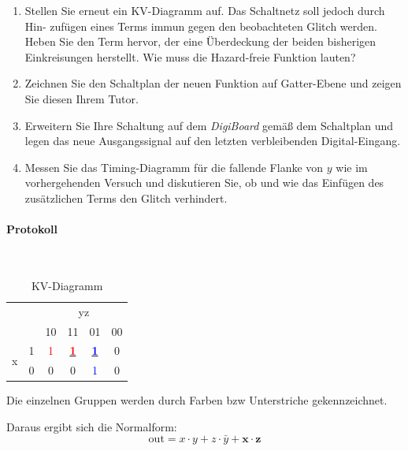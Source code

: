 \documentclass[10pt]{scrreprt}
\begin{document}
    \begin{enumerate}
        \item Stellen Sie erneut ein KV-Diagramm auf. Das Schaltnetz soll jedoch durch Hin-
            zufügen eines Terms immun gegen den beobachteten Glitch werden. Heben Sie den
            Term hervor, der eine Überdeckung der beiden bisherigen Einkreisungen herstellt.
            Wie muss die Hazard-freie Funktion lauten?
        \item Zeichnen Sie den Schaltplan der neuen Funktion auf Gatter-Ebene und zeigen Sie
            diesen Ihrem Tutor.
        \item Erweitern Sie Ihre Schaltung auf dem \textit{DigiBoard} gemäß dem Schaltplan und legen
            das neue Ausgangssignal auf den letzten verbleibenden Digital-Eingang.
        \item Messen Sie das Timing-Diagramm für die fallende Flanke von $y$ wie im vorhergehenden
            Versuch und diskutieren Sie, ob und wie das Einfügen des zusätzlichen Terms
            den Glitch verhindert.
    \end{enumerate}

    \paragraph{Protokoll}
    $ $

    \begin{table}[H]
        \centering
        \begin{tabular}{cc|cccc}
            & &  & \multicolumn{2}{c}{yz}\\
            & & 10 & 11 & 01 & 00\\
            \midrule
            \multirow{ 2}{*}{x} & 1 & \textcolor{red}{1} & \textbf{\underline{\textcolor{red}{1}}} & \textbf{\underline{\textcolor{blue}{1}}} & 0\\
             & 0 & 0 & 0 & \textcolor{blue}{1} & 0\\
        \end{tabular}
        \caption{KV-Diagramm}
    \end{table}

    Die einzelnen Gruppen werden durch Farben bzw Unterstriche gekennzeichnet.

    Daraus ergibt sich die Normalform:
    \begin{equation*}
        \text{out} = x \cdot y + z \cdot \bar{y} + \mathbf{x \cdot z}
    \end{equation*}
\end{document}
